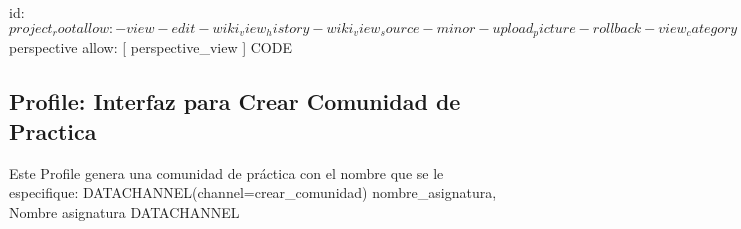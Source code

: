 \begin{pyglist}[language=text]
    id: $project_root
    allow:
      - view 
      - edit
      - wiki_view_history
      - wiki_view_source
      - minor
      - upload_picture
      - rollback
      - view_category
      - search
      - delete_account
      - group_view
      - group_view_members
      - view_category
      - add_object
      - modify_object_categories
      - remove
      - rollback
      - wiki_attach_files
      - admin_attachments
      - view_attachments
      - upload_picture
      - minor
      - rename
      - lock
      - edit_structures
      - edit_copyrights
      - wiki_view_comments
      - wiki_view_ratings
      - wiki_vote_ratings
      - wiki_admin_ratings
      - wiki_view_history
      - use_HTML
   -
    type: perspective
    id: $perspective
    allow: [ perspective_view ]
{CODE}
\end{pyglist}

\subsection{Profile: Interfaz para Crear Comunidad de Practica}
\label{section:creacion-comunidad-gui}

\begin{pyglist}[language=text]
Este Profile genera una comunidad de práctica con el nombre que se le especifique:
{DATACHANNEL(channel=crear_comunidad)}
nombre_asignatura, Nombre asignatura
{DATACHANNEL}
\end{pyglist}
